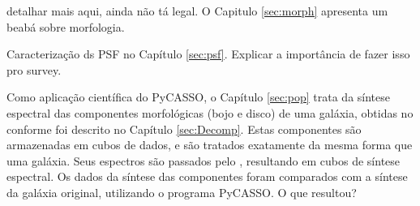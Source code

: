 \TODO detalhar mais aqui, ainda não tá legal. O Capitulo \ref{sec:morph}
apresenta um beabá sobre morfologia.

\TODO Caracterização ds PSF no Capítulo \ref{sec:psf}. Explicar a importância
de fazer isso pro survey.

Como aplicação científica do PyCASSO, o Capítulo \ref{sec:pop} trata da síntese
espectral das componentes morfológicas (bojo e disco) de uma galáxia, obtidas no
conforme foi descrito no Capítulo \ref{sec:Decomp}. Estas componentes são
armazenadas em cubos de dados, e são tratados exatamente da mesma forma que
uma galáxia. Seus espectros são passados pelo \starlight, resultando em cubos
de síntese espectral. Os dados da síntese das componentes foram comparados com a
síntese da galáxia original, utilizando o programa PyCASSO. \TODO O que
resultou?


